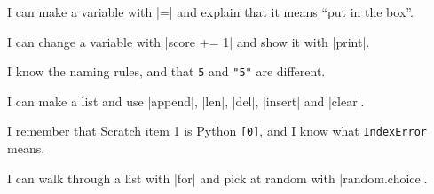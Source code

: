 \smallskip
\begin{tcolorbox}[colback=variables!10, colframe=variables!80!black, arc=6pt, boxrule=0.8pt, left=10pt, top=2pt, bottom=2pt, title={\textbf{Part 3 checklist}}, coltitle=white, colbacktitle=variables!80!black]
\tick I can make a variable with \py|=| and explain that it means ``put in the box''.\par
\tick I can change a variable with \py|score += 1| and show it with \py|print|.\par
\tick I know the naming rules, and that \texttt{5} and \texttt{"5"} are different.\par
\tick I can make a list and use \py|append|, \py|len|, \py|del|, \py|insert| and \py|clear|.\par
\tick I remember that Scratch item 1 is Python \texttt{[0]}, and I know what \texttt{IndexError} means.\par
\tick I can walk through a list with \py|for| and pick at random with \py|random.choice|.
\end{tcolorbox}
